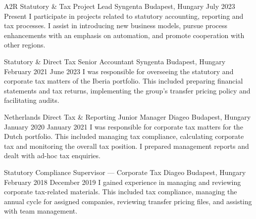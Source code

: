 


\begin{cventries}


  \cventry
    {A2R Statutory \& Tax Project Lead} %
    {Syngenta} %
    {Budapest, Hungary} %
    {July 2023 \textendash Present} %
    {} %
    {I participate in projects related to statutory accounting, reporting and tax processes. I assist in introducing new business models, pursue process enhancements with an emphasis on automation, and promote cooperation with other regions.} %


  \cventry
    {Statutory \& Direct Tax Senior Accountant} %
    {Syngenta} %
    {Budapest, Hungary} %
    {February 2021 \textendash June 2023} %
    {} %
    {I was responsible for overseeing the statutory and corporate tax matters of the Iberia portfolio. This included preparing financial statements and tax returns, implementing the group's transfer pricing policy and facilitating audits.} %


  \cventry
    {Netherlands Direct Tax \& Reporting Junior Manager} %
    {Diageo} %
    {Budapest, Hungary} %
    {January 2020 \textendash January 2021} %
    {} %
    {I was responsible for corporate tax matters for the Dutch portfolio. This included managing tax compliance, calculating corporate tax and monitoring the overall tax position. I prepared management reports and dealt with ad-hoc tax enquiries.} %


  \cventry
    {Statutory Compliance Supervisor — Corporate Tax} %
    {Diageo} %
    {Budapest, Hungary} %
    {February 2018 \textendash December 2019} %
    {} %
    {I gained experience in managing and reviewing corporate tax-related materials. This included tax compliance, managing the annual cycle for assigned companies, reviewing transfer pricing files, and assisting with team management.} %


\end{cventries}

